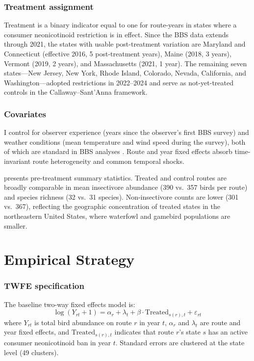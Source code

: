 \documentclass[12pt]{article}
\begin{document}
\subsubsection*{Treatment assignment} Treatment is a binary indicator equal to one for route-years in states where a consumer neonicotinoid restriction is in effect. Since the BBS data extends through 2021, the states with usable post-treatment variation are Maryland and Connecticut (effective 2016, 5 post-treatment years), Maine (2018, 3 years), Vermont (2019, 2 years), and Massachusetts (2021, 1 year). The remaining seven states---New Jersey, New York, Rhode Island, Colorado, Nevada, California, and Washington---adopted restrictions in 2022--2024 and serve as not-yet-treated controls in the Callaway--Sant'Anna framework.

\subsubsection*{Covariates} I control for observer experience (years since the observer's first BBS survey) and weather conditions (mean temperature and wind speed during the survey), both of which are standard in BBS analyses \citep{sauer2017first}. Route and year fixed effects absorb time-invariant route heterogeneity and common temporal shocks.

 presents pre-treatment summary statistics. Treated and control routes are broadly comparable in mean insectivore abundance (390 vs.\ 357 birds per route) and species richness (32 vs.\ 31 species). Non-insectivore counts are lower (301 vs.\ 367), reflecting the geographic concentration of treated states in the northeastern United States, where waterfowl and gamebird populations are smaller.


\section{Empirical Strategy}

\subsubsection*{TWFE specification} The baseline two-way fixed effects model is:
\begin{equation}
\log(Y_{rt} + 1) = \alpha_r + \lambda_t + \beta \cdot \text{Treated}_{s(r),t} + \varepsilon_{rt}
\label{eq:twfe}
\end{equation}
where $Y_{rt}$ is total bird abundance on route $r$ in year $t$, $\alpha_r$ and $\lambda_t$ are route and year fixed effects, and $\text{Treated}_{s(r),t}$ indicates that route $r$'s state $s$ has an active consumer neonicotinoid ban in year $t$. Standard errors are clustered at the state level (49 clusters).
\end{document}
